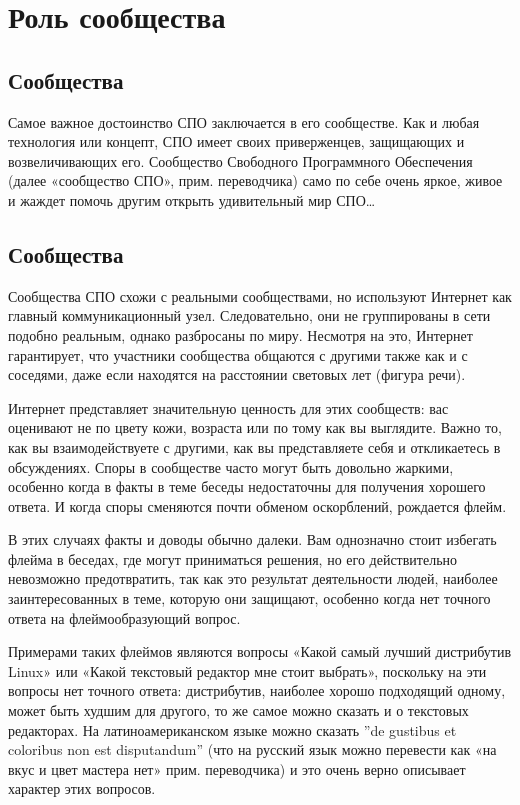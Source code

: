 \documentclass[10pt]{book}
\begin{document}
\newpage


\chapter{Роль сообщества}

\section*{Сообщества}

Самое важное достоинство СПО заключается в его сообществе. Как и любая технология или концепт, СПО имеет своих приверженцев, защищающих и возвеличивающих его. Сообщество Свободного Программного Обеспечения (далее «сообщество СПО», прим. переводчика) само по себе очень яркое, живое и жаждет помочь другим открыть удивительный мир СПО\ldots

\section{Сообщества}

Сообщества СПО схожи с реальными сообществами, но используют Интернет как главный коммуникационный узел. Следовательно, они не группированы в сети подобно реальным, однако разбросаны по миру. Несмотря на это, Интернет гарантирует, что участники сообщества общаются с другими также как и с соседями, даже если находятся на расстоянии световых лет (фигура речи).

Интернет представляет значительную ценность для этих сообществ: вас оценивают не по цвету кожи, возраста или по тому как вы выглядите. Важно то, как вы взаимодействуете с другими, как вы представляете себя и откликаетесь в обсуждениях. Споры в сообществе часто могут быть довольно жаркими, особенно когда в факты в теме беседы недостаточны для получения хорошего ответа. И когда споры сменяются почти обменом оскорблений, рождается флейм.

В этих случаях факты и доводы обычно далеки. Вам однозначно стоит избегать флейма в беседах, где могут приниматься решения, но его действительно невозможно предотвратить, так как это результат деятельности людей, наиболее заинтересованных в теме, которую они защищают, особенно когда нет точного ответа на флеймообразующий вопрос. 

Примерами таких флеймов являются вопросы «Какой самый лучший дистрибутив Linux» или «Какой текстовый редактор мне стоит выбрать», поскольку на эти вопросы нет точного ответа: дистрибутив, наиболее хорошо подходящий одному, может быть худшим для другого, то же самое можно сказать и о текстовых редакторах. На латиноамериканском языке можно сказать ''de gustibus et coloribus non est disputandum'' (что на русский язык можно перевести как «на вкус и цвет мастера нет» прим. переводчика) и это очень верно описывает характер этих вопросов. 
\end{document}
